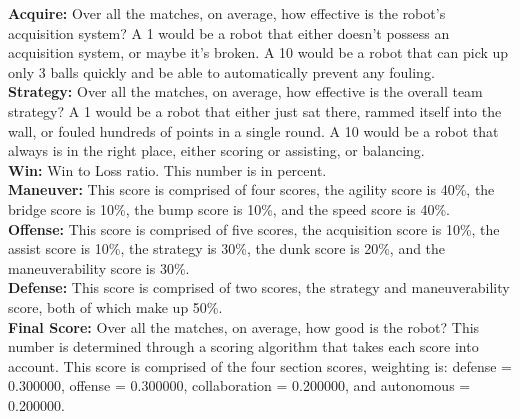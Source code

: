 \documentclass[landscape, 10pt]{report}
\begin{document}
\textbf{Acquire: }Over all the matches, on average, how effective is the robot's acquisition system? A 1 would be a robot that either doesn't possess an acquisition system, or maybe it's broken. A 10 would be a robot that can pick up only 3 balls quickly and be able to automatically prevent any fouling. \\ 
\textbf{Strategy: }Over all the matches, on average, how effective is the overall team strategy? A 1 would be a robot that either just sat there, rammed itself into the wall, or fouled hundreds of points in a single round. A 10 would be a robot that always is in the right place, either scoring or assisting, or balancing. \\ 
\textbf{Win: }Win to Loss ratio. This number is in percent. \\ 
\textbf{Maneuver: }This score is comprised of four scores, the agility score is 40\%, the bridge score is 10\%, the bump score is 10\%, and the speed score is 40\%.\\ 
\textbf{Offense: }This score is comprised of five scores, the acquisition score is 10\%, the assist score is 10\%, the strategy is 30\%, the dunk score is 20\%, and the maneuverability score is 30\%.\\ 
\textbf{Defense: }This score is comprised of two scores, the strategy and maneuverability score, both of which make up 50\%.\\ 
\textbf{Final Score: }Over all the matches, on average, how good is the robot? This number is determined through a scoring algorithm that takes each score into account. This score is comprised of the four section scores, weighting is: defense = 0.300000, offense = 0.300000, collaboration = 0.200000, and autonomous = 0.200000. \\ 
 
\theendnotes 
\end{document}
